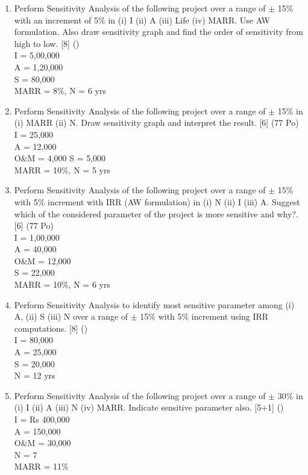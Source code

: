 \documentclass[12pt]{article}
\begin{document}
\begin{enumerate}
			\item Perform Sensitivity Analysis of the following project over a range of $\pm$ 15\% with an increment of 5\% in (i) I (ii) A (iii) Life (iv) MARR. Use AW formulation.  Also draw sensitivity graph and find the order of sensitivity from high to low. \hfill [8] ()\\
			I = 5,00,000\\
			A = 1,20,000\\
			S = 80,000\\
			MARR = 8\%, N = 6 yrs
			
			\item Perform Sensitivity Analysis of the following project over a range of $\pm$ 15\% in (i) MARR (ii) N. Draw sensitivity graph and interpret the result. \hfill [6] (77 Po)\\
			I = 25,000\\
			A = 12,000\\
			O\&M = 4,000
			S = 5,000\\
			MARR = 10\%, N = 5 yrs

			\item Perform Sensitivity Analysis of the following project over a range of $\pm$ 15\% with 5\% increment with IRR (AW formulation) in (i) N (ii) I (iii) A. Suggest which of the considered parameter of the project is more sensitive and why?. \hfill [6] (77 Po)\\
			I = 1,00,000\\
			A = 40,000\\
			O\&M = 12,000\\
			S = 22,000\\
			MARR = 10\%, N = 6 yrs

			\item Perform Sensitivity Analysis to identify most sensitive parameter among (i) A, (ii) S (iii) N over a range of $\pm$ 15\% with 5\% increment using IRR computations. \hfill [8] ()\\
			I = 80,000\\
			A = 25,000\\
			S = 20,000\\
			N = 12 yrs

			\item Perform Sensitivity Analysis of the following project over a range of $\pm$ 30\% in (i) I (ii) A (iii) N (iv) MARR. Indicate sensitive parameter also. \hfill [5+1] ()\\
			I = Rs 400,000\\
			A = 150,000\\
			O\&M = 30,000\\
			N = 7\\
			MARR = 11\%


\end{enumerate}
\end{document}

